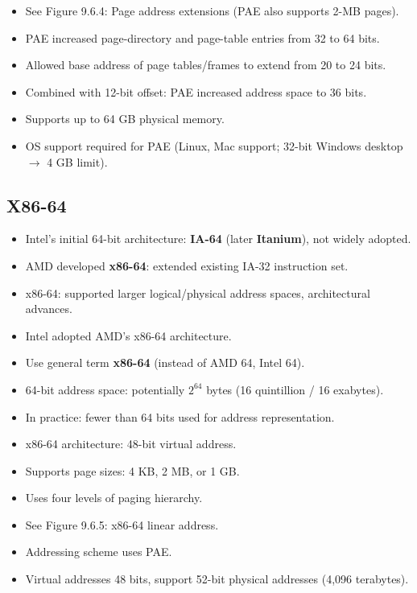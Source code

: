 \begin{itemize}
    \item See Figure 9.6.4: Page address extensions (PAE also supports 2-MB pages).
    \item PAE increased page-directory and page-table entries from 32 to 64 bits.
    \item Allowed base address of page tables/frames to extend from 20 to 24 bits.
    \item Combined with 12-bit offset: PAE increased address space to 36 bits.
    \item Supports up to 64 GB physical memory.
    \item OS support required for PAE (Linux, Mac support; 32-bit Windows desktop $\rightarrow$ 4 GB limit).
\end{itemize}

\subsection*{X86-64}
\begin{itemize}
    \item Intel's initial 64-bit architecture: \textbf{IA-64} (later \textbf{Itanium}), not widely adopted.
    \item AMD developed \textbf{x86-64}: extended existing IA-32 instruction set.
    \item x86-64: supported larger logical/physical address spaces, architectural advances.
    \item Intel adopted AMD's x86-64 architecture.
    \item Use general term \textbf{x86-64} (instead of AMD 64, Intel 64).
    \item 64-bit address space: potentially $2^{64}$ bytes (16 quintillion / 16 exabytes).
    \item In practice: fewer than 64 bits used for address representation.
    \item x86-64 architecture: 48-bit virtual address.
    \item Supports page sizes: 4 KB, 2 MB, or 1 GB.
    \item Uses four levels of paging hierarchy.
    \item See Figure 9.6.5: x86-64 linear address.
    \item Addressing scheme uses PAE.
    \item Virtual addresses 48 bits, support 52-bit physical addresses (4,096 terabytes).
\end{itemize}

